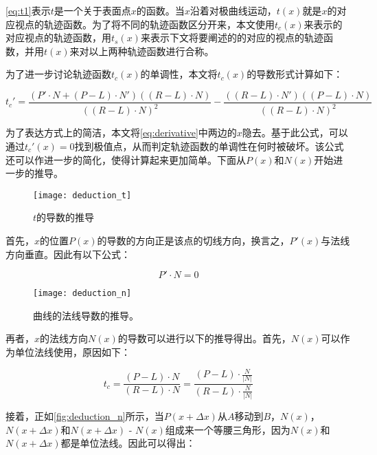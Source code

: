 \autoref{eq:t1}表示$t$是一个关于表面点$x$的函数。当$x$沿着对极曲线运动，$t(x)$就是\conp{}$x$的对应视点的轨迹函数。为了将不同的轨迹函数区分开来，本文使用$t_c(x)$来表示\conp{}的对应视点的轨迹函数，用$t_s(x)$来表示下文将要阐述的\sconp{}的对应的视点的轨迹函数，并用$t(x)$来对以上两种轨迹函数进行合称。

为了进一步讨论轨迹函数$t_c(x)$的单调性，本文将$t_c(x)$的导数形式计算如下：

\begin{equation}\label{eq:derivative}
  t_c' = \frac{(P'\cdot{N}+(P-L)\cdot{N'})((R-L)\cdot{N})}{((R-L)\cdot{N})^2}-\frac{((R-L)\cdot{N'})((P-L)\cdot{N})}{((R-L)\cdot{N})^2}
\end{equation}

为了表达方式上的简洁，本文将\autoref{eq:derivative}中两边的$x$隐去。基于此公式，可以通过$t_c'(x)=0$找到极值点，从而判定轨迹函数的单调性在何时被破坏。该公式还可以作进一步的简化，使得计算起来更加简单。下面从$P(x)$和$N(x)$开始进一步的推导。

\begin{figure}[bth]
    \centering
    \texttt{[image: deduction\_t]}
    \caption{\label{fig:deduction_t}
    $t$的导数的推导}
\end{figure}  

首先，$x$的位置$P(x)$的导数的方向正是该点的切线方向，换言之，$P'(x)$与法线方向垂直。因此有以下公式：

\begin{equation}\label{eq:perp}
    P'\cdot{N} = 0
\end{equation}

\begin{figure}[bth]
    \centering
    \texttt{[image: deduction\_n]}
    \caption{\label{fig:deduction_n}
    曲线的法线导数的推导。}
\end{figure}

再者，$x$的法线方向$N(x)$的导数可以进行以下的推导得出。首先，$N(x)$可以作为单位法线使用，原因如下：

\begin{equation}
    t_c = \frac{(P-L)\cdot{N}}{(R-L)\cdot{N}} = \frac{(P-L)\cdot{\frac{N}{|N|}}}{(R-L)\cdot{\frac{N}{|N|}}}
\end{equation}

接着，正如\autoref{fig:deduction_n}所示，当$P(x+\Delta x)$从$A$移动到$B$，$N(x)$，$N(x+\Delta x)$和$N(x+\Delta x)$ - $N(x)$组成来一个等腰三角形，因为$N(x)$和$N(x+\Delta x)$都是单位法线。因此可以得出：

